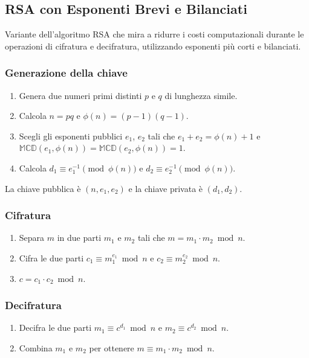 \documentclass[a4paper,12pt]{report}
\begin{document}
\subsection{RSA con Esponenti Brevi e Bilanciati} \cite{10.1007/978-3-540-30580-4_14}
Variante dell'algoritmo RSA che mira a ridurre i costi computazionali durante le operazioni di cifratura e decifratura, utilizzando esponenti più corti e bilanciati.

\subsubsection*{Generazione della chiave}
\begin{enumerate}
    \item Genera due numeri primi distinti $p$ e $q$ di lunghezza simile.
    \item Calcola $n = pq$ e $\phi(n) = (p-1)(q-1)$.
    \item Scegli gli esponenti pubblici $e_1$, $e_2$ tali che $e_1 + e_2 = \phi(n) + 1$ e $\mathbb{MCD}(e_1, \phi(n)) = \mathbb{MCD}(e_2, \phi(n)) = 1$.
    \item Calcola $d_1 \equiv e_1^{-1} \pmod{\phi(n)}$ e $d_2 \equiv e_2^{-1} \pmod{\phi(n)}$.
\end{enumerate}
La chiave pubblica è $(n, e_1, e_2)$ e la chiave privata è $(d_1, d_2)$.

\subsubsection*{Cifratura}
\begin{enumerate}
    \item Separa $m$ in due parti $m_1$ e $m_2$ tali che $m = m_1 \cdot m_2 \bmod n$.
    \item Cifra le due parti $c_1 \equiv m_1^{e_1} \bmod n$ e $c_2 \equiv m_2^{e_2} \bmod n$.
    \item $c = c_1 \cdot c_2 \bmod n$.
\end{enumerate}

\subsubsection*{Decifratura}
\begin{enumerate}
    \item Decifra le due parti $m_1 \equiv c^{d_1} \bmod n$ e $m_2 \equiv c^{d_2} \bmod n$.
    \item Combina $m_1$ e $m_2$ per ottenere $m \equiv m_1 \cdot m_2 \bmod n$.
\end{enumerate}
\end{document}
